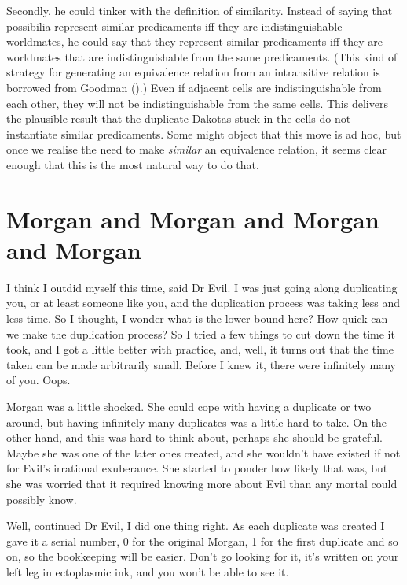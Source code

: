 \documentclass[
  10pt,
  letterpaper,
  DIV=11,
  numbers=noendperiod,
  twoside]{scrartcl}
\begin{document}
Secondly, he could tinker with the definition of similarity. Instead of
saying that possibilia represent similar predicaments iff they are
indistinguishable worldmates, he could say that they represent similar
predicaments iff they are worldmates that are indistinguishable from the
same predicaments. (This kind of strategy for generating an equivalence
relation from an intransitive relation is borrowed from Goodman
().) Even if adjacent cells are
indistinguishable from each other, they will not be indistinguishable
from the same cells. This delivers the plausible result that the
duplicate Dakotas stuck in the cells do not instantiate similar
predicaments. Some might object that this move is ad hoc, but once we
realise the need to make \emph{similar} an equivalence relation, it
seems clear enough that this is the most natural way to do that.

\section{Morgan and Morgan and Morgan and
Morgan}\label{morgan-and-morgan-and-morgan-and-morgan}

I think I outdid myself this time, said Dr Evil. I was just going along
duplicating you, or at least someone like you, and the duplication
process was taking less and less time. So I thought, I wonder what is
the lower bound here? How quick can we make the duplication process? So
I tried a few things to cut down the time it took, and I got a little
better with practice, and, well, it turns out that the time taken can be
made arbitrarily small. Before I knew it, there were infinitely many of
you. Oops.

Morgan was a little shocked. She could cope with having a duplicate or
two around, but having infinitely many duplicates was a little hard to
take. On the other hand, and this was hard to think about, perhaps she
should be grateful. Maybe she was one of the later ones created, and she
wouldn't have existed if not for Evil's irrational exuberance. She
started to ponder how likely that was, but she was worried that it
required knowing more about Evil than any mortal could possibly know.

Well, continued Dr Evil, I did one thing right. As each duplicate was
created I gave it a serial number, 0 for the original Morgan, 1 for the
first duplicate and so on, so the bookkeeping will be easier. Don't go
looking for it, it's written on your left leg in ectoplasmic ink, and
you won't be able to see it.
\end{document}
